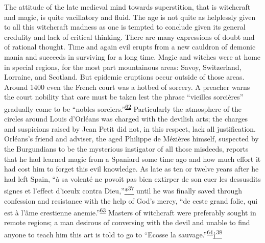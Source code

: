 \protect\hypertarget{18_Chapter_Eleven__THE_FORMS_OF_THO.xhtmlux5cux23page_287}{}{}The
attitude of the late medieval mind towards superstition, that is
witchcraft and magic, is quite vacillatory and fluid. The age is not
quite as helplessly given to all this witchcraft madness as one is
tempted to conclude given its general credulity and lack of critical
thinking. There are many expressions of doubt and of rational thought.
Time and again evil erupts from a new cauldron of demonic mania and
succeeds in surviving for a long time. Magic and witches were at home in
special regions, for the most part mountainous areas: Savoy,
Switzerland, Lorraine, and Scotland. But epidemic eruptions occur
outside of those areas. Around 1400 even the French court was a hotbed
of sorcery. A preacher warns the court nobility that care must be taken
lest the phrase ``vieilles sorcières'' gradually come to be ``nobles
sorciers.''\textsuperscript{\protect\hypertarget{18_Chapter_Eleven__THE_FORMS_OF_THO.xhtmlux5cux23id_509}{\protect\hyperlink{23_NOTES.xhtmlux5cux23id_510}{62}}}
Particularly the atmosphere of the circles around Louis d'Orléans was
charged with the devilish arts; the charges and suspicions raised by
Jean Petit did not, in this respect, lack all justification. Orléans's
friend and adviser, the aged Philippe de Mézières himself, suspected by
the Burgundians to be the mysterious instigator of all those misdeeds,
reports that he had learned magic from a Spaniard some time ago and how
much effort it had cost him to forget this evil knowledge. As late as
ten or twelve years after he had left Spain, ``à sa volenté ne povoit
pas bien extirper de son cuer les dessusdits signes et l'effect d'iceulx
contra
Dieu,''\protect\hypertarget{18_Chapter_Eleven__THE_FORMS_OF_THO.xhtmlux5cux23id_2635}{\protect\hyperlink{23_NOTES.xhtmlux5cux23id_2636}{*\textsuperscript{37}}}
until he was finally saved through confession and resistance with the
help of God's mercy, ``de ceste grand folie, qui est à l'âme crestienne
anemie.''\textsuperscript{\protect\hypertarget{18_Chapter_Eleven__THE_FORMS_OF_THO.xhtmlux5cux23id_508}{\protect\hyperlink{23_NOTES.xhtmlux5cux23page_431}{63}}}
Masters of witchcraft were preferably sought in remote regions; a man
desirous of conversing with the devil and unable to find anyone to teach
him this art is told to go to ``Ecosse la
sauvage.''\textsuperscript{\protect\hypertarget{18_Chapter_Eleven__THE_FORMS_OF_THO.xhtmlux5cux23id_506}{\protect\hyperlink{23_NOTES.xhtmlux5cux23id_507}{64}}}\protect\hypertarget{18_Chapter_Eleven__THE_FORMS_OF_THO.xhtmlux5cux23id_2637}{\protect\hyperlink{23_NOTES.xhtmlux5cux23id_2638}{†\textsuperscript{38}}}

